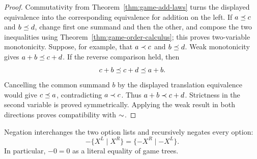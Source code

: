 \begin{proof}
  Commutativity from Theorem~\ref{thm:game-add-laws} turns the displayed
  equivalence into the
  corresponding equivalence for addition on the left.  If
  \(a\preceq c\) and \(b\preceq d\), change first one summand and then the
  other, and compose the two inequalities using
  Theorem~\ref{thm:game-order-calculus}; this proves two-variable
  monotonicity.  Suppose, for example, that \(a\prec c\) and
  \(b\preceq d\).  Weak monotonicity gives \(a+b\preceq c+d\).  If the reverse
  comparison held, then
  \[
    c+b\preceq c+d\preceq a+b.
  \]
  Cancelling the common summand \(b\) by the displayed translation equivalence
  would give \(c\preceq a\), contradicting \(a\prec c\).  Thus
  \(a+b\prec c+d\).  Strictness in the second variable is proved
  symmetrically.  Applying the weak result in both directions proves
  compatibility with \(\sim\).
\end{proof}

\begin{definition}[Negation]
  \label{def:game-neg}
  \leanok
  Negation interchanges the two option lists and recursively negates every option:
  \[
    -\{X^L\mid X^R\}=\{-X^R\mid -X^L\}.
  \]
  In particular, \(-0=0\) as a literal equality of game trees.
\end{definition}

